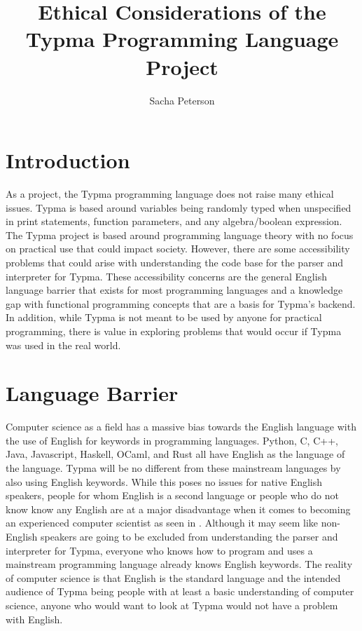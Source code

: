 \documentclass[10pt,twocolumn]{article}
\title{Ethical Considerations of the Typma Programming Language Project}
\author{Sacha Peterson}
\affiliation{Occidental College}
\begin{document}
\maketitle

\section{Introduction}

As a project, the Typma programming language does not raise many ethical issues. Typma is based around variables being randomly typed when unspecified in print statements, function parameters, and any algebra/boolean expression. The Typma project is based around programming language theory with no focus on practical use that could impact society. However, there are some accessibility problems that could arise with understanding the code base for the parser and interpreter for Typma. These accessibility concerns are the general English language barrier that exists for most programming languages and a knowledge gap with functional programming concepts that are a basis for Typma's backend. In addition, while Typma is not meant to be used by anyone for practical programming, there is value in exploring problems that would occur if Typma was used in the real world.

\section{Language Barrier}

Computer science as a field has a massive bias towards the English language with the use of English for keywords in programming languages. Python, C, C++, Java, Javascript, Haskell, OCaml, and Rust all have English as the language of the language. Typma will be no different from these mainstream languages by also using English keywords. While this poses no issues for native English speakers, people for whom English is a second language or people who do not know know any English are at a major disadvantage when it comes to becoming an experienced computer scientist as seen in \textcite{Veerasamy2014Teaching}. Although it may seem like non-English speakers are going to be excluded from understanding the parser and interpreter for Typma, everyone who knows how to program and uses a mainstream programming language already knows English keywords. The reality of computer science is that English is the standard language and the intended audience of Typma being people with at least a basic understanding of computer science, anyone who would want to look at Typma would not have a problem with English.
\end{document}
